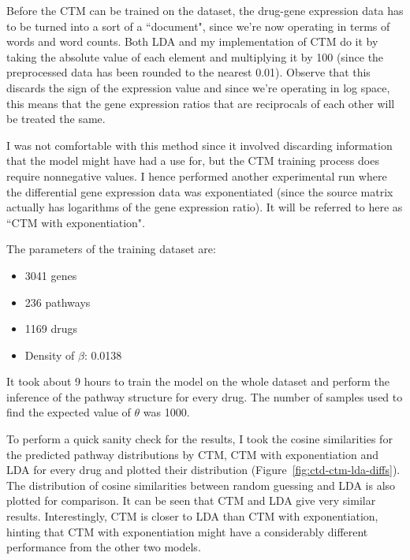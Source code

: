 \documentclass[12pt,a4paper,twoside,openright]{report}
\begin{document}
Before the CTM can be trained on the dataset, the drug-gene expression data has to be turned into a sort of a ``document", since we're now operating in terms of words and word counts. Both LDA and my implementation of CTM do it by taking the absolute value of each element and multiplying it by 100 (since the preprocessed data has been rounded to the nearest 0.01). Observe that this discards the sign of the expression value and since we're operating in log space, this means that the gene expression ratios that are reciprocals of each other will be treated the same.

I was not comfortable with this method since it involved discarding information that the model might have had a use for, but the CTM training process does require nonnegative values. I hence performed another experimental run where the differential gene expression data was exponentiated (since the source matrix actually has logarithms of the gene expression ratio). It will be referred to here as ``CTM with exponentiation".

The parameters of the training dataset are:
\begin{itemize}[noitemsep]
\item 3041 genes
\item 236 pathways
\item 1169 drugs
\item Density of $\beta$: 0.0138
\end{itemize}

It took about 9 hours to train the model on the whole dataset and perform the inference of the pathway structure for every drug. The number of samples used to find the expected value of $\theta$ was 1000.

To perform a quick sanity check for the results, I took the cosine similarities for the predicted pathway distributions by CTM, CTM with exponentiation and LDA for every drug and plotted their distribution (Figure~\ref{fig:ctd-ctm-lda-diffs}). The distribution of cosine similarities between random guessing and LDA is also plotted for comparison. It can be seen that CTM and LDA give very similar results. Interestingly, CTM is closer to LDA than CTM with exponentiation, hinting that CTM with exponentiation might have a considerably different performance from the other two models.
\end{document}
